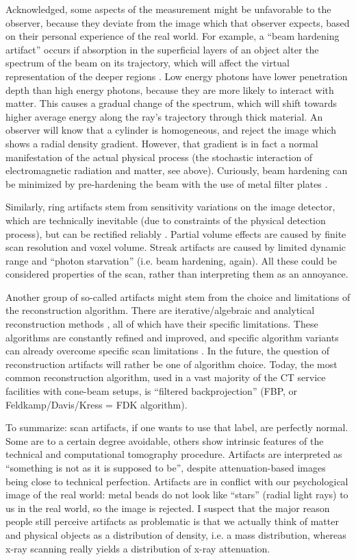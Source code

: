Acknowledged, some aspects of the measurement might be unfavorable to the observer, because they deviate from the image which that observer expects, based on their personal experience of the real world.
For example, a ``beam hardening artifact'' occurs if absorption in the superficial layers of an object alter the spectrum of the beam on its trajectory, which will affect the virtual representation of the deeper regions \citep{VanGompel2011}.
Low energy photons have lower penetration depth than high energy photons, because they are more likely to interact with matter.
This causes a gradual change of the spectrum, which will shift towards higher average energy along the ray's trajectory through thick material.
An observer will know that a cylinder is homogeneous, and reject the image which shows a radial density gradient.
However, that gradient is in fact a normal manifestation of the actual physical process (the stochastic interaction of electromagnetic radiation and matter, see above).
Curiously, beam hardening can be minimized by pre-hardening the beam with the use of metal filter plates \citep{Triche2019}.

Similarly, ring artifacts stem from sensitivity variations on the image detector, which are technically inevitable (due to constraints of the physical detection process), but can be rectified reliably \citep{Sijbers2004}.
Partial volume effects are caused by finite scan resolution and voxel volume.
Streak artifacts are caused by limited dynamic range and ``photon starvation'' (i.e. beam hardening, again).
All these could be considered properties of the scan, rather than interpreting them as an annoyance.

Another group of so-called artifacts might stem from the choice and limitations of the reconstruction algorithm.
There are iterative/algebraic and analytical reconstruction methods \citep{Gilbert1972,Andersen1984,Feldkamp1984,Geyer2015,Hansen2021}, all of which have their specific limitations.
These algorithms are constantly refined and improved, and specific algorithm variants can already overcome specific scan limitations \citep[e.g.][]{Six2019,Frenkel2022}.
In the future, the question of reconstruction artifacts will rather be one of algorithm choice.
Today, the most common reconstruction algorithm, used in a vast majority of the CT service facilities with cone-beam setups, is ``filtered backprojection'' (FBP, or Feldkamp/Davis/Kress = FDK algorithm).


To summarize: scan artifacts, if one wants to use that label, are perfectly normal.
Some are to a certain degree avoidable, others show intrinsic features of the technical and computational tomography procedure.
Artifacts are interpreted as ``something is not as it is supposed to be'', despite attenuation-based images being close to technical perfection.
Artifacts are in conflict with our psychological image of the real world: metal beads do not look like ``stars'' (radial light rays) to us in the real world, so the image is rejected.
I suspect that the major reason people still perceive artifacts as problematic is that we actually think of matter and physical objects as a distribution of density, i.e. a mass distribution, whereas x-ray scanning really yields a distribution of x-ray attenuation.

